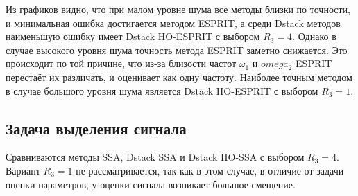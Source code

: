 \documentclass[specialist,
  substylefile=spbu_report.rtx,
subf,href,colorlinks=true, 12pt]{disser}
\theoremstyle{plain}
\theoremstyle{definition}
\theoremstyle{remark}
\begin{document}
Из графиков видно, что при малом уровне шума все методы близки по
точности, и минимальная ошибка достигается методом ESPRIT, а среди
Dstack методов наименьшую ошибку имеет Dstack HO-ESPRIT с выбором $R_3=4$.
Однако в случае высокого уровня шума точность метода ESPRIT заметно снижается.
Это происходит по той причине, что из-за близости частот $\omega_1$ и
$omega_2$ ESPRIT
перестаёт их различать, и оценивает как одну частоту.
Наиболее точным методом в случае большого уровня шума является Dstack
HO-ESPRIT с выбором $R_3=1$.

\subsection{Задача выделения сигнала}\label{subsec:dstack-signal}
Сравниваются методы SSA, Dstack SSA и Dstack
HO-SSA с выбором $R_3=4$.
Вариант $R_3=1$ не рассматривается, так как в этом случае, в отличие от задачи
оценки параметров, у оценки сигнала возникает большое смещение.
\end{document}
